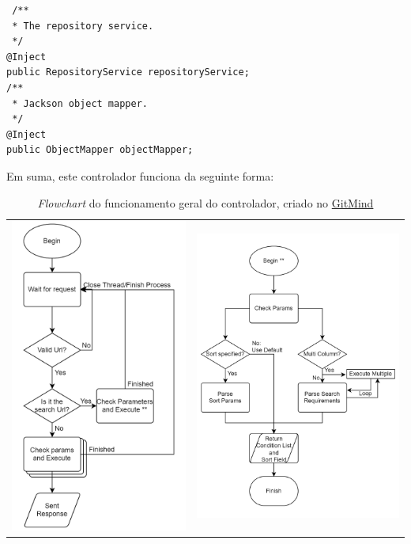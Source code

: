 \begin{verbatim}
 /**
 * The repository service.
 */
@Inject
public RepositoryService repositoryService;
/**
 * Jackson object mapper.
 */
@Inject
public ObjectMapper objectMapper;
\end{verbatim}

Em suma, este controlador funciona da seguinte forma:

\begin{table}[!hbt]
        \centering
        \begin{tabular}{ll}
                \includegraphics[width=6cm]{figuras/flowchart2.png}
                \label{fig:flow2} &
                \includegraphics[width=7cm]{figuras/flowchart3.png}
                \label{fig:flow3}   \\
        \end{tabular}
        \caption{\textit{Flowchart} do funcionamento geral do controlador, criado no \href{https://gitmind.com/app/flowchart/8d511739737}{GitMind}}
\end{table}
\FloatBarrier

